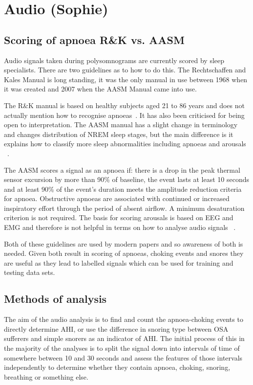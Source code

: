 \section{Audio (Sophie)}
\label{sec:audio-sophie}
\subsection{Scoring of apnoea R\&K vs. AASM}
Audio signals taken during polysomnograms are currently scored by sleep specialists. There are two guidelines as to how to do this. The Rechtschaffen and Kales Manual is long standing, it was the only manual in use between 1968 when it was created and 2007 when the AASM Manual came into use. 

The R\&K manual is based on healthy subjects aged 21 to 86 years and does not actually mention how to recognise apnoeas~\cite{rechtschaffen1968manual}. It has also been criticised for being open to interpretation. The AASM manual has a slight change in terminology and changes distribution of NREM sleep stages, but the main difference is it explains how to classify more sleep abnormalities including apnoeas and arousals ~\cite{moser2009sleep}.

The AASM scores a signal as an apnoea if: there is a drop in the peak thermal sensor excursion by more than 90\% of baseline, the event lasts at least 10 seconds and at least 90\% of the event’s duration meets the amplitude reduction criteria for apnoea. Obstructive apnoeas are associated with continued or increased inspiratory effort through the period of absent airflow. A minimum desaturation criterion is not required. The basis for scoring arousals is based on EEG and EMG and therefore is not helpful in terms on how to analyse audio signals ~\cite{iber2007aasm}.

Both of these guidelines are used by modern papers and so awareness of both is needed. Given both result in scoring of apnoeas, choking events and snores they are useful as they lead to labelled signals which can be used for training and testing data sets.
\subsection{Methods of analysis}
The aim of the audio analysis is to find and count the apnoea-choking events to directly determine AHI, or use the difference in snoring type between OSA sufferers and simple snorers as an indicator of AHI. The initial process of this in the majority of the analyses is to split the signal down into intervals of time of somewhere between 10 and 30 seconds and assess the features of those intervals independently to determine whether they contain apnoea, choking, snoring, breathing or something else.

